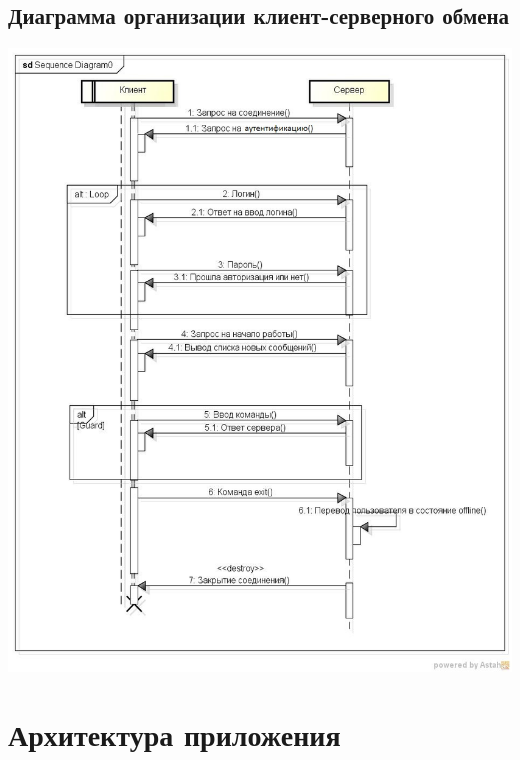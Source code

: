 \documentclass[10pt,a4paper]{report}
\begin{document}
\section{Диаграмма организации клиент-серверного обмена}
\includegraphics[scale=0.5]{diagram}
\chapter{Архитектура приложения}
\end{document}

